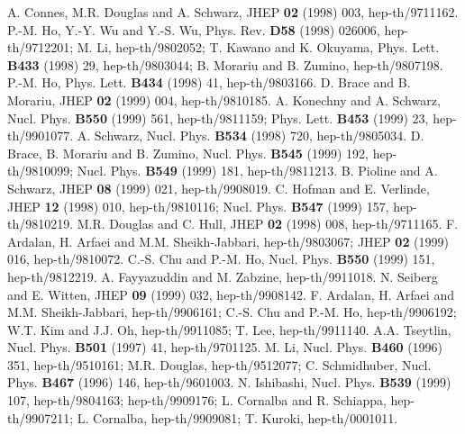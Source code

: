 \documentclass[12pt,a4paper]{article}
\begin{document}
\begin{thebibliography}{99}
 A. Connes, M.R. Douglas and A. Schwarz, JHEP 
\textbf{02} (1998) 003, hep-th/9711162.
 P.-M. Ho, Y.-Y. Wu and Y.-S. Wu, Phys. Rev. \textbf{D58}
(1998) 026006, hep-th/9712201; M. Li, hep-th/9802052;
T. Kawano and K. Okuyama, Phys. Lett. \textbf{B433} (1998) 29,
hep-th/9803044; B. Morariu and B. Zumino, hep-th/9807198.
 P.-M. Ho, Phys. Lett. \textbf{B434} (1998) 41, hep-th/9803166.
 D. Brace and B. Morariu, JHEP \textbf{02} (1999) 004,
 hep-th/9810185.
 A. Konechny and A. Schwarz, Nucl. Phys. \textbf{B550} (1999)
561, hep-th/9811159; Phys. Lett. \textbf{B453} (1999) 23, hep-th/9901077.
 A. Schwarz, Nucl. Phys. \textbf{B534} (1998) 720, 
hep-th/9805034.
 D. Brace, B. Morariu and B. Zumino, Nucl. Phys. 
\textbf{B545} (1999) 192, hep-th/9810099; Nucl. Phys. 
\textbf{B549} (1999) 181, hep-th/9811213.
 B. Pioline and A. Schwarz, JHEP \textbf{08} (1999)
021, hep-th/9908019.
 C. Hofman and E. Verlinde, JHEP \textbf{12} (1998) 010,
hep-th/9810116;  Nucl. Phys. \textbf{B547} (1999) 157, hep-th/9810219.
 M.R. Douglas and C. Hull, JHEP \textbf{02} (1998) 008, 
hep-th/9711165.
 F. Ardalan, H. Arfaei and M.M. Sheikh-Jabbari, 
hep-th/9803067;  JHEP \textbf{02} (1999) 016, hep-th/9810072.
 C.-S. Chu and P.-M. Ho, Nucl. Phys. \textbf{B550} (1999) 
151, hep-th/9812219.
 A. Fayyazuddin and M. Zabzine, hep-th/9911018.
 N. Seiberg and E. Witten, JHEP \textbf{09} (1999) 
032, hep-th/9908142.
 F. Ardalan, H. Arfaei and M.M. Sheikh-Jabbari, 
hep-th/9906161; C.-S. Chu and P.-M. Ho, hep-th/9906192;
W.T. Kim and J.J. Oh, hep-th/9911085; T. Lee, hep-th/9911140.
 A.A. Tseytlin, Nucl. Phys. \textbf{B501} (1997) 41,
hep-th/9701125.
 M. Li, Nucl. Phys. \textbf{B460} (1996) 351, 
hep-th/9510161; M.R. Douglas, hep-th/9512077; 
C. Schmidhuber, Nucl. Phys. \textbf{B467} (1996) 146, hep-th/9601003.
 N. Ishibashi, Nucl. Phys. \textbf{B539} (1999) 107,
hep-th/9804163; hep-th/9909176; L. Cornalba and R. Schiappa,
hep-th/9907211; L. Cornalba, hep-th/9909081;
T. Kuroki, hep-th/0001011.
\end{thebibliography}
  
\end{document}
